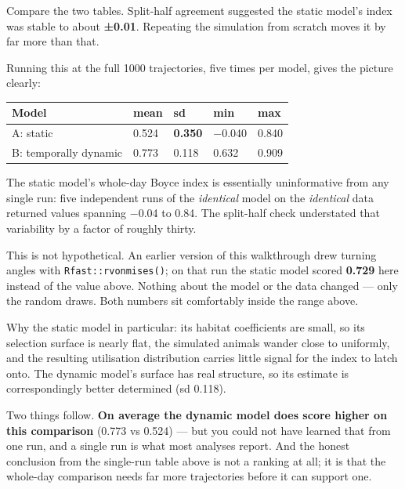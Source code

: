\documentclass[
  letterpaper,
  DIV=11,
  numbers=noendperiod]{scrartcl}
\newcounter{none} %
\begin{document}
\begin{tcolorbox}[enhanced jigsaw, arc=.35mm, bottomrule=.15mm, bottomtitle=1mm, breakable, colback=white, colbacktitle=quarto-callout-important-color!10!white, colframe=quarto-callout-important-color-frame, coltitle=black, left=2mm, leftrule=.75mm, opacityback=0, opacitybacktitle=0.6, rightrule=.15mm, title=\textcolor{quarto-callout-important-color}{\faExclamation}\hspace{0.5em}{A split-half check is necessary but nowhere near sufficient}, titlerule=0mm, toprule=.15mm, toptitle=1mm]

Compare the two tables. Split-half agreement suggested the static
model's index was stable to about \textbf{±0.01}. Repeating the
simulation from scratch moves it by far more than that.

Running this at the full 1000 trajectories, five times per model, gives
the picture clearly:

{\def\LTcaptype{none} %
\begin{longtable}[]{@{}lllll@{}}
\toprule\noalign{}
Model & mean & sd & min & max \\
\midrule\noalign{}
\endhead
\bottomrule\noalign{}
\endlastfoot
A: static & 0.524 & \textbf{0.350} & −0.040 & 0.840 \\
B: temporally dynamic & 0.773 & 0.118 & 0.632 & 0.909 \\
\end{longtable}
}

The static model's whole-day Boyce index is essentially uninformative
from any single run: five independent runs of the \emph{identical} model
on the \emph{identical} data returned values spanning −0.04 to 0.84. The
split-half check understated that variability by a factor of roughly
thirty.

This is not hypothetical. An earlier version of this walkthrough drew
turning angles with \texttt{Rfast::rvonmises()}; on that run the static
model scored \textbf{0.729} here instead of the value above. Nothing
about the model or the data changed --- only the random draws. Both
numbers sit comfortably inside the range above.

Why the static model in particular: its habitat coefficients are small,
so its selection surface is nearly flat, the simulated animals wander
close to uniformly, and the resulting utilisation distribution carries
little signal for the index to latch onto. The dynamic model's surface
has real structure, so its estimate is correspondingly better determined
(sd 0.118).

Two things follow. \textbf{On average the dynamic model does score
higher on this comparison} (0.773 vs 0.524) --- but you could not have
learned that from one run, and a single run is what most analyses
report. And the honest conclusion from the single-run table above is not
a ranking at all; it is that the whole-day comparison needs far more
trajectories before it can support one.

\end{tcolorbox}
\end{document}
